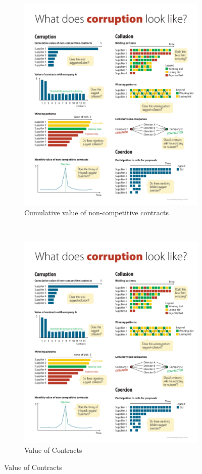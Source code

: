 \begin{figure}[H]
\begin{subfigure}[t]{0.5\textwidth}
\caption{Cumulative value of non-competitive contracts}
\label{fig_cum_value}
\includegraphics[max width=1\textwidth]{../img/poster_cumulative_value.pdf}
\end{subfigure}
~
\begin{subfigure}[t]{0.5\textwidth}
\caption{Value of Contracts}
\label{fig_value}
\includegraphics[max width=1\textwidth]{../img/poster_value.pdf}

\end{subfigure}
\end{figure}
